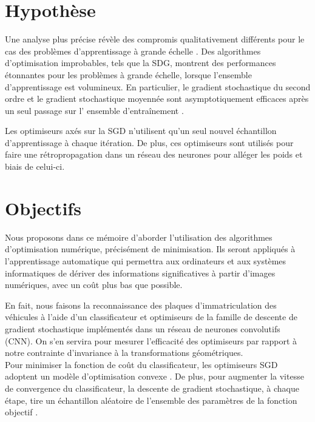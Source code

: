 	\section{Hypothèse}
		Une analyse plus précise révèle des compromis qualitativement différents pour le cas des problèmes d'apprentissage à grande échelle \cite{bottou2018optimization}. Des algorithmes d'optimisation improbables, tels que la SDG, montrent des performances étonnantes pour les problèmes à grande échelle, lorsque l'ensemble d'apprentissage est volumineux. En particulier, le gradient stochastique du second ordre et le gradient stochastique moyennée sont asymptotiquement efficaces après un seul passage sur l' ensemble d'entraînement \cite{bottou2010large}. 
		
		Les optimiseurs axés sur la SGD n'utilisent qu'un seul nouvel échantillon d'apprentissage à chaque itération. De plus, ces optimiseurs sont utilisés pour faire une rétropropagation dans un réseau des neurones pour alléger les poids et biais de celui-ci.
		
		
			
	
	\section{Objectifs}
		
		Nous proposons dans ce mémoire d'aborder l'utilisation des algorithmes d'optimisation numérique, précisément de minimisation. Ils seront appliqués à l'apprentissage automatique qui permettra aux ordinateurs et aux systèmes informatiques de dériver des informations significatives à partir d'images numériques, avec un coût plus bas que possible.
		
		En fait, nous faisons la reconnaissance des plaques d’immatriculation des véhicules à l'aide d’un classificateur et optimiseurs de la famille de descente de gradient stochastique implémentés dans un réseau de neurones convolutifs (CNN). On s’en servira pour mesurer l'efficacité des optimiseurs par rapport à notre contrainte d’invariance à la transformations géométriques.\\
		Pour minimiser la fonction de coût du classificateur, les optimiseurs SGD adoptent un modèle d'optimisation convexe \cite{deepa2021ai}. De plus, pour augmenter la vitesse de convergence du classificateur, la descente de gradient stochastique, à chaque étape, tire un échantillon aléatoire de l'ensemble des paramètres de la fonction objectif \cite{bottou2018optimization}.
		
